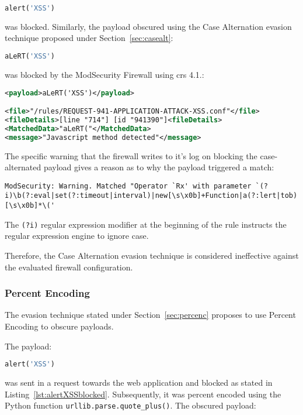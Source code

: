 \begin{lstlisting}[style=basicStyle, language=Python]
alert('XSS')
\end{lstlisting}
was blocked. Similarly, the payload obscured using the Case Alternation evasion technique proposed under Section~\ref{sec:casealt}:

\begin{lstlisting}[style=basicStyle, language=Python]
aLeRT('XSS')
\end{lstlisting}
was blocked by the ModSecurity Firewall using \acrshort{crs} 4.1.:

\begin{lstlisting}[style=ruleStyle, language=XML, caption=aLeRT('XSS') blocked, label=lst:alertcasealternationblocked]
<payload>aLeRT('XSS')</payload>

<file>"/rules/REQUEST-941-APPLICATION-ATTACK-XSS.conf"</file>
<fileDetails>[line "714"] [id "941390"]<fileDetails>
<MatchedData>"aLeRT("</MatchedData>
<message>"Javascript method detected"</message>
\end{lstlisting}
The specific warning that the firewall writes to it's log on blocking the case-alternated payload gives a reason as to why the payload triggered a match:

\begin{lstlisting}[style=basicStyle]
ModSecurity: Warning. Matched "Operator `Rx' with parameter `(?i)\b(?:eval|set(?:timeout|interval)|new[\s\x0b]+Function|a(?:lert|tob)|btoa|prompt|confirm)[\s\x0b]*\('
\end{lstlisting}
The \verb|(?i)| regular expression modifier at the beginning of the rule instructs the regular expression engine to ignore case. \cite{regex/jan}

Therefore, the Case Alternation evasion technique is considered ineffective against the evaluated firewall configuration.


\subsubsection{Percent Encoding}
\label{sec:percencsingleiter}
The evasion technique stated under Section~\ref{sec:percenc} proposes to use Percent Encoding to obscure payloads.

The payload:

\begin{lstlisting}[style=basicStyle, language=Python]
alert('XSS')
\end{lstlisting}
was sent in a request towards the web application and blocked as stated in Listing~\ref{lst:alertXSSblocked}. Subsequently, it was percent encoded using the Python function \verb|urllib.parse.quote_plus()|. The obscured payload:


